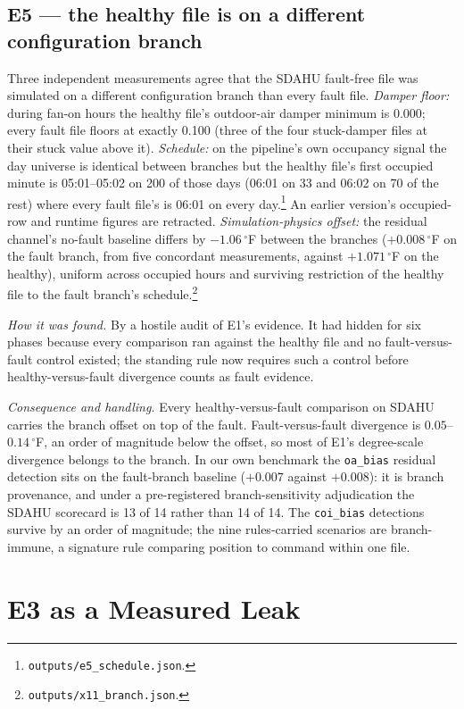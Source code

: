\documentclass[runningheads]{llncs}
\begin{document}
\subsection{E5 --- the healthy file is on a different configuration branch}

Three independent measurements agree that the SDAHU fault-free file was simulated on a different configuration branch than every fault file. \emph{Damper floor:} during fan-on hours the healthy file's outdoor-air damper minimum is 0.000; every fault file floors at exactly 0.100 (three of the four stuck-damper files at their stuck value above it). \emph{Schedule:} on the pipeline's own occupancy signal the day universe is identical between branches but the healthy file's first occupied minute is 05:01--05:02 on 200 of those days (06:01 on 33 and 06:02 on 70 of the rest) where every fault file's is 06:01 on every day.\footnote{\texttt{outputs/e5\_schedule.json}.} An earlier version's occupied-row and runtime figures are retracted. \emph{Simulation-physics offset:} the residual channel's no-fault baseline differs by $-1.06\,^\circ$F between the branches ($+0.008\,^\circ$F on the fault branch, from five concordant measurements, against $+1.071\,^\circ$F on the healthy), uniform across occupied hours and surviving restriction of the healthy file to the fault branch's schedule.\footnote{\texttt{outputs/x11\_branch.json}.}

\emph{How it was found.} By a hostile audit of E1's evidence. It had hidden for six phases because every comparison ran against the healthy file and no fault-versus-fault control existed; the standing rule now requires such a control before healthy-versus-fault divergence counts as fault evidence.

\emph{Consequence and handling.} Every healthy-versus-fault comparison on SDAHU carries the branch offset on top of the fault. Fault-versus-fault divergence is $0.05$--$0.14\,^\circ$F, an order of magnitude below the offset, so most of E1's degree-scale divergence belongs to the branch. In our own benchmark the \texttt{oa\_bias} residual detection sits on the fault-branch baseline ($+0.007$ against $+0.008$): it is branch provenance, and under a pre-registered branch-sensitivity adjudication the SDAHU scorecard is 13 of 14 rather than 14 of 14. The \texttt{coi\_bias} detections survive by an order of magnitude; the nine rules-carried scenarios are branch-immune, a signature rule comparing position to command within one file.

\section{E3 as a Measured Leak}
\label{sec:leak}
\end{document}
